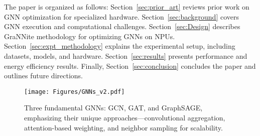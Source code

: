 
\noindent The paper is organized as follows: Section~\ref{sec:prior_art} reviews prior work on GNN optimization for specialized hardware. Section~\ref{sec:background} covers GNN execution and computational challenges. Section~\ref{sec:Design} describes GraNNite methodology for optimizing GNNs on NPUs. Section~\ref{sec:expt_methodology} explains the experimental setup, including datasets, models, and hardware. Section~\ref{sec:results} presents performance and energy efficiency results. Finally, Section~\ref{sec:conclusion} concludes the paper and outlines future directions.


\begin{figure}[t!]
\begin{center}
\texttt{[image: Figures/GNNs\_v2.pdf]}%
\end{center}
\caption{Three fundamental GNNs: GCN, GAT, and GraphSAGE, emphasizing their unique approaches—convolutional aggregation, attention-based weighting, and neighbor sampling for scalability.}\label{fig:GNNs}
\end{figure}



